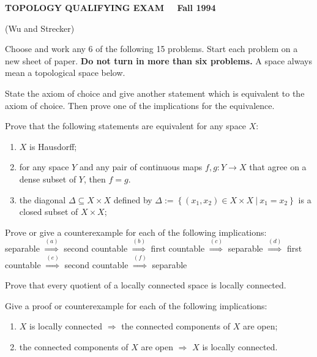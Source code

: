 \documentclass[12pt]{article}
\begin{document}
 \begin{center}

 {\bf TOPOLOGY QUALIFYING EXAM \ \ Fall 1994}

(Wu and Strecker)

 \end{center}


        Choose and work any 6 of the following 15 problems. Start each
 problem on a new sheet of paper. {\bf Do not turn in more than six
 problems.}
A space always mean a topological space below.

\vspace{10pt}
State the axiom of choice and give another statement which is equivalent to
the axiom of choice. Then prove one of the implications for the equivalence.

\vspace{10pt}
  Prove that the following statements are equivalent
for any space $X$:
\begin{enumerate}
  \item $X$ is Hausdorff;
  \item for any space $Y$ and any pair of continuous maps
        $f, g : Y\rightarrow X$ that agree on a dense subset of $Y$,
        then $f=g$.
  \item the diagonal $\Delta\subseteq X \times X$ defined by
        $\Delta := \left\{ (x_1, x_2) \in X\times X \ |\  x_1=x_2 \right\} $
        is a closed subset of $X\times X$;
\end{enumerate}

\vspace{10pt}
Prove or give a counterexample for each of the following implications: \\
separable $\stackrel{(a)}{\Rightarrow}$ second countable
 $\stackrel{(b)}{\Rightarrow}$ first countable  $\stackrel{(c)}{\Rightarrow}$
separable  $\stackrel{(d)}{\Rightarrow}$ first countable
 $\stackrel{(e)}{\Rightarrow}$ second countable  $\stackrel{(f)}{\Rightarrow}$
separable

\vspace{10pt}
Prove that every quotient of a locally connected space is locally connected.

\vspace{10pt}
Give a proof or counterexample for each of the following implications:
\begin{enumerate}
  \item $X$ is locally connected $\Rightarrow$ the connected components of $X$
      are open;
  \item  the connected components of $X$ are open
         $\Rightarrow$ $X$ is locally connected.
\end{enumerate}
\end{document}
